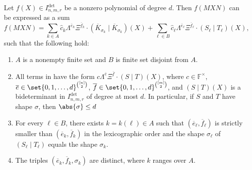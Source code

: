 \documentclass[10pt,a4paper]{amsart}
\newcommand*\F{\mathbb{F}}
\begin{document}
\begin{lem}\label{lem:twosides}
Let $f(X) \in I^{\det}_{n, m, r}$ 
be a nonzero polynomial of degree $d$.
Then $f(MXN)$ can be expressed as a sum
\begin{equation}\label{eq:expansion2}
        f(MXN) = \sum_{k \in A} \widehat{c}_{k} \Lambda^{\overline{e}_k}\Xi^{\overline{f}_k}\cdot (\overline{K}_{\sigma_k}\mid \overline{K}_{\sigma_k})(X) + \sum_{\ell \in B} \widehat{c}_{\ell} \Lambda^{\overline{e}_\ell}\Xi^{\overline{f}_\ell}\cdot (S_\ell\mid T_\ell)(X),
    \end{equation}
such that the following hold:
\begin{enumerate}
    \item\label{item:expansion2_i0} $A$ is a nonempty finite set and $B$ is finite set disjoint from $A$.
    \item\label{item:expansion2_i1} All terms in  have the form $c \Lambda^{\overline{e}}\Xi^{\overline{f}}\cdot (S\mid T)(X)$, where $c\in \F^\times$, $\overline{e} \in \set{0,1,\dots,d}^{\binom{[n]}{2}}$, $\overline{f}\in \set{0,1,\dots,d}^{\binom{[m]}{2}}$,
    and $(S\mid T)(X)$ is a bideterminant in $I^{\det}_{n, m, r}$ of degree at most $d$.
    In particular, if $S$ and $T$ have shape $\sigma$, then $\abs{\sigma} \leq d$ 
    \item\label{item:expansion2_i1.5} For every $\ell\in B$, there exists $k=k(\ell)\in A$ such that $(\overline{e}_\ell, \overline{f}_\ell)$ is strictly smaller than $(\overline{e}_k,\overline{f}_k)$ in the lexicographic order and the shape $\sigma_\ell$ of $(S_\ell\mid T_\ell)$ equals the shape $\sigma_k$.
    \item\label{item:expansion2_i2} The triples $(\overline{e}_k,\overline{f}_k,\sigma_k)$ are distinct, where $k$ ranges over $A$.
\end{enumerate} 
\end{lem}
\end{document}
